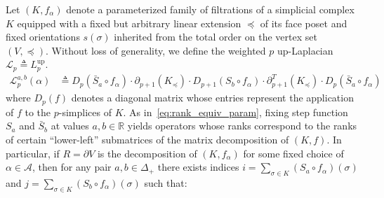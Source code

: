 
Let $(K, f_\alpha)$ denote a parameterized family of filtrations of a simplicial complex $K$ equipped with a fixed but arbitrary linear extension $ \preceq$ of its face poset and fixed orientations $s(\sigma)$ inherited from the total order on the vertex set $(V, \preceq)$.
Without loss of generality, we define the weighted $p$ up-Laplacian $\mathcal{L}_p \triangleq  L_p^{\mathrm{up}}$. 
\begin{align}\label{eq:laplacian_decouple}
\mathcal{L}_p^{a,b}(\alpha) & \triangleq D_p(\bar{S}_a \circ f_\alpha) \cdot \partial_{p+1}(K_\preceq) \cdot D_{p+1}(S_b \circ f_\alpha) \cdot \partial_{p+1}^T(K_\preceq) \cdot D_p(\bar{S}_a \circ f_\alpha) 
\end{align}
where $D_p(f)$ denotes a diagonal matrix whose entries represent the application of $f$ to the $p$-simplices of $K$.
As in~\eqref{eq:rank_equiv_param}, fixing step function $S_a$ and $\bar{S}_b$ at values $a, b \in \mathbb{R}$ yields operators whose ranks correspond to the ranks of certain ``lower-left'' submatrices of the matrix decomposition of $(K, f)$. In particular, if $R = \partial V$ is the decomposition of $(K, f_\alpha)$ for some fixed choice of $\alpha \in \mathcal{A}$, then for any pair $a,b\in \Delta_+$ there exists indices $i = \sum_{\sigma \in K} (S_a \circ f_\alpha)(\sigma)$ and $j = \sum_{\sigma \in K} (S_b \circ f_\alpha)(\sigma)$ such that:
